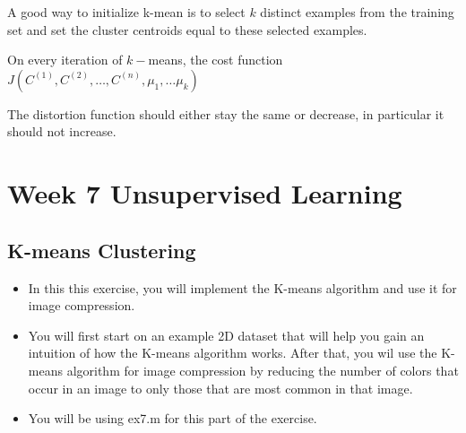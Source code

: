 \documentclass[11pt]{article} %
\begin{document}
A good way to initialize k-mean is to select $k$ distinct examples from the training set and set the cluster centroids equal to these selected examples.

On every iteration of $k-$means, the cost function $J(C^{(1)},C^{(2)},\ldots, C^{(n)},
\mu_1,\ldots \mu_k)$

The distortion function should either stay the same or decrease, in particular it should not increase.


\section{Week 7 Unsupervised Learning}
\subsection{K-means Clustering}


\begin{itemize}
	\item In this this exercise, you will implement the K-means algorithm and use it for image compression.
	
	\item You will first start on an example 2D dataset that will help you gain an intuition of
	how the K-means algorithm works. After that, you wil use the K-means algorithm for image
	compression by reducing the number of colors that occur in an image to only those that are most common in that image.
	
	\item You will be using ex7.m for this part of the exercise.
	
\end{itemize}
\end{document}
